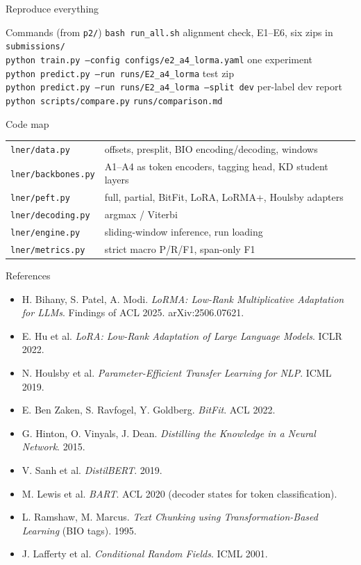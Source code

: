 \documentclass[aspectratio=169,11pt]{beamer}
\newcommand{\code}[1]{\texttt{\small #1}}
\begin{document}
\begin{frame}{Reproduce everything}
  \footnotesize
  \begin{block}{Commands (from \code{p2/})}
    \code{bash run\_all.sh} \hfill alignment check, E1--E6, six zips in \code{submissions/}\\
    \code{python train.py --config configs/e2\_a4\_lorma.yaml} \hfill one experiment\\
    \code{python predict.py --run runs/E2\_a4\_lorma} \hfill test zip\\
    \code{python predict.py --run runs/E2\_a4\_lorma --split dev} \hfill per-label dev report\\
    \code{python scripts/compare.py} \hfill \code{runs/comparison.md}
  \end{block}
  \begin{block}{Code map}
    \begin{tabular}{@{}ll@{}}
      \code{lner/data.py} & offsets, presplit, BIO encoding/decoding, windows \\
      \code{lner/backbones.py} & A1--A4 as token encoders, tagging head, KD student layers \\
      \code{lner/peft.py} & full, partial, BitFit, LoRA, LoRMA+, Houlsby adapters \\
      \code{lner/decoding.py} & argmax / Viterbi \\
      \code{lner/engine.py} & sliding-window inference, run loading \\
      \code{lner/metrics.py} & strict macro P/R/F1, span-only F1 \\
    \end{tabular}
  \end{block}
\end{frame}

\begin{frame}{References}
  \footnotesize
  \begin{itemize}
    \item H. Bihany, S. Patel, A. Modi. \emph{LoRMA: Low-Rank Multiplicative Adaptation for LLMs}. Findings of ACL 2025. arXiv:2506.07621.
    \item E. Hu et al. \emph{LoRA: Low-Rank Adaptation of Large Language Models}. ICLR 2022.
    \item N. Houlsby et al. \emph{Parameter-Efficient Transfer Learning for NLP}. ICML 2019.
    \item E. Ben Zaken, S. Ravfogel, Y. Goldberg. \emph{BitFit}. ACL 2022.
    \item G. Hinton, O. Vinyals, J. Dean. \emph{Distilling the Knowledge in a Neural Network}. 2015.
    \item V. Sanh et al. \emph{DistilBERT}. 2019.
    \item M. Lewis et al. \emph{BART}. ACL 2020 (decoder states for token classification).
    \item L. Ramshaw, M. Marcus. \emph{Text Chunking using Transformation-Based Learning} (BIO tags). 1995.
    \item J. Lafferty et al. \emph{Conditional Random Fields}. ICML 2001.
  \end{itemize}
\end{frame}
\end{document}
